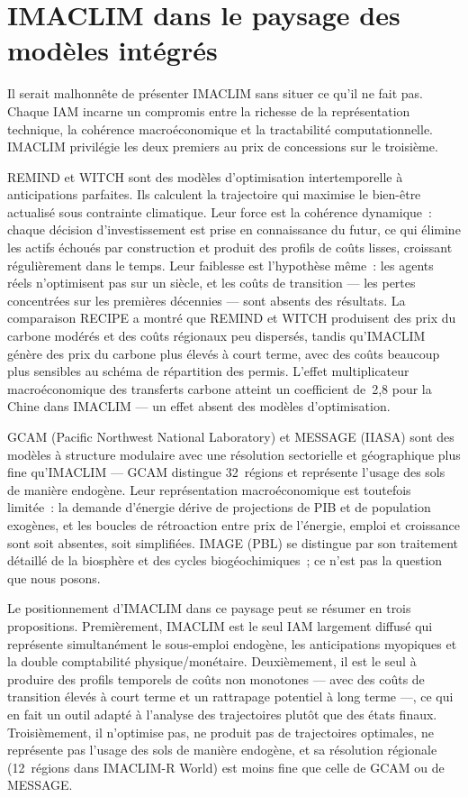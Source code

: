 \section{IMACLIM dans le paysage des modèles intégrés}\label{sec:imaclim-paysage}

Il serait malhonnête de présenter IMACLIM sans situer ce qu'il ne fait pas. Chaque IAM incarne un compromis entre la richesse de la représentation technique, la cohérence macroéconomique et la tractabilité computationnelle. IMACLIM privilégie les deux premiers au prix de concessions sur le troisième.

REMIND \parencite{bauer_remind-r_2012} et WITCH \parencite{bosetti_witch_2006} sont des modèles d'optimisation intertemporelle à anticipations parfaites. Ils calculent la trajectoire qui maximise le bien-être actualisé sous contrainte climatique. Leur force est la cohérence dynamique~: chaque décision d'investissement est prise en connaissance du futur, ce qui élimine les actifs échoués par construction et produit des profils de coûts lisses, croissant régulièrement dans le temps. Leur faiblesse est l'hypothèse même~: les agents réels n'optimisent pas sur un siècle, et les coûts de transition --- les pertes concentrées sur les premières décennies --- sont absents des résultats. La comparaison RECIPE \parencite{luderer_regional_2012} a montré que REMIND et WITCH produisent des prix du carbone modérés et des coûts régionaux peu dispersés, tandis qu'IMACLIM génère des prix du carbone plus élevés à court terme, avec des coûts beaucoup plus sensibles au schéma de répartition des permis. L'effet multiplicateur macroéconomique des transferts carbone atteint un coefficient de~2,8 pour la Chine dans IMACLIM --- un effet absent des modèles d'optimisation.

GCAM (Pacific Northwest National Laboratory) et MESSAGE (IIASA) sont des modèles à structure modulaire avec une résolution sectorielle et géographique plus fine qu'IMACLIM --- GCAM distingue 32~régions et représente l'usage des sols de manière endogène. Leur représentation macroéconomique est toutefois limitée~: la demande d'énergie dérive de projections de PIB et de population exogènes, et les boucles de rétroaction entre prix de l'énergie, emploi et croissance sont soit absentes, soit simplifiées. IMAGE (PBL) se distingue par son traitement détaillé de la biosphère et des cycles biogéochimiques~; ce n'est pas la question que nous posons.

Le positionnement d'IMACLIM dans ce paysage peut se résumer en trois propositions. Premièrement, IMACLIM est le seul IAM largement diffusé qui représente simultanément le sous-emploi endogène, les anticipations myopiques et la double comptabilité physique/monétaire. Deuxièmement, il est le seul à produire des profils temporels de coûts non monotones --- avec des coûts de transition élevés à court terme et un rattrapage potentiel à long terme ---, ce qui en fait un outil adapté à l'analyse des trajectoires plutôt que des états finaux. Troisièmement, il n'optimise pas, ne produit pas de \og trajectoires optimales\fg{}, ne représente pas l'usage des sols de manière endogène, et sa résolution régionale (12~régions dans IMACLIM-R World) est moins fine que celle de GCAM ou de MESSAGE.


